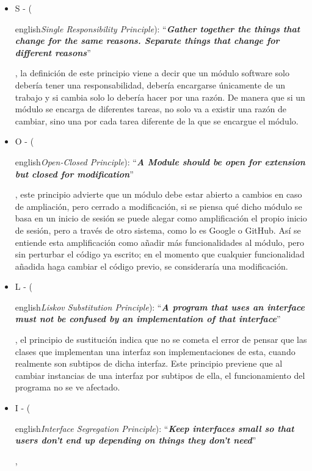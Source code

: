 \begin{itemize}
    \item S - (\begin{otherlanguage} {english}\textit{Single Responsibility Principle}):  ``\textit{\textbf{Gather together the things that change for the same reasons. Separate things that change for different reasons}}''\end{otherlanguage},
    la definición de este principio viene a decir que un módulo software solo debería tener una responsabilidad, 
    debería encargarse únicamente de un trabajo y si cambia solo lo debería hacer por una razón. De manera que si un 
    módulo se encarga de diferentes tareas, no solo va a existir una razón de cambiar, sino una por cada tarea 
    diferente de la que se encargue el módulo. 
    \item O - (\begin{otherlanguage} {english}\textit{Open-Closed Principle}): ``\textit{\textbf{A Module should be open for extension but closed for modification}}''\end{otherlanguage},
    este principio advierte que un módulo debe estar abierto a cambios en caso de ampliación, pero cerrado a 
    modificación, si se piensa qué dicho módulo se basa en un inicio de sesión se puede alegar como amplificación el 
    propio inicio de sesión, pero a través de otro sistema, como lo es Google o GitHub. Así se entiende esta 
    amplificación como añadir más funcionalidades al módulo, pero sin perturbar el código ya escrito; en el momento 
    que cualquier funcionalidad añadida haga cambiar el código previo, se consideraría una modificación.
    \item L - (\begin{otherlanguage} {english}\textit{Liskov Substitution Principle}):
    ``\textit{\textbf{A program that uses an interface must not be confused by an implementation of that interface}}''\end{otherlanguage},
    el principio de sustitución indica que no se cometa el error de pensar que las clases que implementan una interfaz
    son implementaciones de esta, cuando realmente son subtipos de dicha interfaz. Este principio previene que al 
    cambiar instancias de una interfaz por subtipos de ella, el funcionamiento del programa no se ve afectado.
    \item I - (\begin{otherlanguage} {english}\textit{Interface Segregation Principle}):
    ``\textit{\textbf{Keep interfaces small so that users don’t end up depending on things they don’t need}}''\end{otherlanguage},

\end{itemize}

